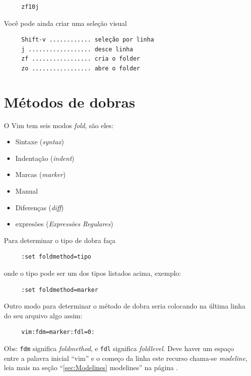 \documentclass[10pt,a4paper,openany]{book}
\begin{document}
\begin{verbatim}
     zf10j
\end{verbatim}

Você pode ainda criar uma seleção visual

\begin{verbatim}
     Shift-v ............ seleção por linha
     j .................. desce linha
     zf ................. cria o folder
     zo ................. abre o folder
\end{verbatim}

\section{Métodos de dobras }
\label{Métodos de dobras }
O Vim tem seis modos {\em fold}, são eles:

\begin{itemize}
\item Sintaxe ({\em syntax})
\item Indentação ({\em indent})
\item Marcas ({\em marker})
\item Manual
\item Diferenças ({\em diff})
\item expresões ({\em Expressões Regulares})
\end{itemize}

Para determinar o tipo de dobra faça

\begin{verbatim}
     :set foldmethod=tipo
\end{verbatim}

onde o tipo pode ser um dos tipos listados acima, exemplo:

\begin{verbatim}
     :set foldmethod=marker
\end{verbatim}

Outro modo para determinar o método de dobra seria colocando na última
linha do seu arquivo algo assim:

\begin{verbatim}
     vim:fdm=marker:fdl=0:
\end{verbatim}

Obs: \verb|fdm| significa {\em foldmethod}, e \verb|fdl| significa
{\em foldlevel}. Deve haver um espaço entre a palavra inicial ``vim'' e o
começo da linha este recurso chama-se {\em modeline}, leia mais na seção
``\ref{sec:Modelines} modelines'' na página \pageref{sec:Modelines}.
\end{document}
